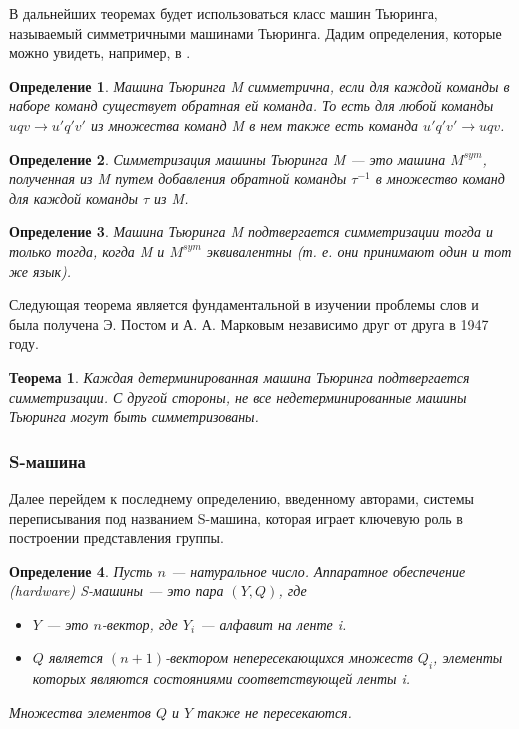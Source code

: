 \documentclass[14pt]{matmex-diploma-custom}
\newtheorem{thm}{Теорема}[subsection]
\newtheorem{defn}{Определение}[subsection]
\begin{document}
В дальнейших теоремах будет использоваться класс машин Тьюринга,
называемый симметричными машинами Тьюринга. Дадим определения, которые можно увидеть, 
например, в \cite{symTM}.

\begin{defn}
Машина Тьюринга M симметрична, если для каждой команды в наборе команд существует
обратная ей команда. То есть для любой команды $ u q v \to u' q' v'$ из множества команд 
M в нем также есть команда $ u' q' v' \to u q v $.
\end{defn}

\begin{defn}
Симметризация машины Тьюринга M --- это машина $M^{sym}$, полученная из M путем добавления обратной 
команды $\tau^{-1}$ в множество команд для каждой команды $\tau$ из M.
\end{defn}

\begin{defn}
Машина Тьюринга M подтвергается симметризации тогда и только тогда, 
когда M и $M^{sym}$ эквивалентны (т. е. они принимают один и тот же язык).
\end{defn}

Следующая теорема является фундаментальной в изучении проблемы слов и была получена 
Э. Постом и А. А. Марковым независимо друг от друга в 1947 году.

\begin{thm} \label{symDetTm}
Каждая детерминированная машина Тьюринга подтвергается симметризации. 
С другой стороны, не все недетерминированные машины Тьюринга могут быть симметризованы.
\end{thm}

\subsubsection{S-машина}

Далее перейдем к последнему определению, введенному авторами, системы переписывания 
под названием S-машина, которая играет ключевую роль в построении представления группы.

\begin{defn}
Пусть $ n $ --- натуральное число.
Аппаратное обеспечение (hardware) S-машины --- это пара $ (Y, Q) $, где
\begin{itemize}
    \item $ Y $ --- это $ n $-вектор, где $ Y_i $ --- алфавит на ленте i.
    \item $ Q $ является $ (n + 1) $-вектором непересекающихся множеств $ Q_i $, элементы которых 
    являются состояниями соответствующей ленты i.
\end{itemize}
Множества элементов $ Q $ и $ Y $ также не пересекаются.
\end{defn}
\end{document}
